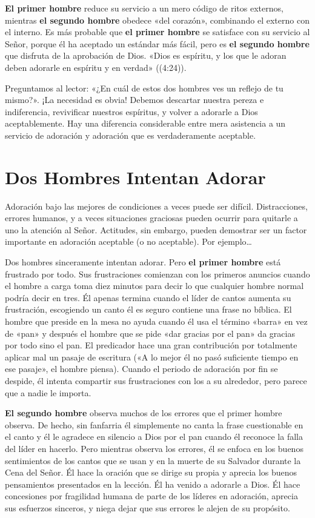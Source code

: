 \documentclass[12pt, twoside, openright]{book}
\begin{document}
\textbf{El primer hombre} reduce su servicio a un mero código de ritos externos, mientras \textbf{el segundo hombre} obedece «del corazón», combinando el externo con el interno. Es más probable que \textbf{el primer hombre} se satisface con su servicio al Señor, porque él ha aceptado un estándar más fácil, pero es \textbf{el segundo hombre} que disfruta de la aprobación de Dios. «Dios es espíritu, y los que le adoran deben adorarle en espíritu y en verdad» ((4:24)). 

Preguntamos al lector: «¿En cuál de estos dos hombres ves un reflejo de tu mismo?». ¡La necesidad es obvia! Debemos descartar nuestra pereza e indiferencia, revivificar nuestros espíritus, y volver a adorarle a Dios aceptablemente. Hay una diferencia considerable entre mera asistencia a un servicio de adoración y adoración que es verdaderamente aceptable. 

\section{Dos Hombres Intentan Adorar}
Adoración bajo las mejores de condiciones a veces puede ser difícil. Distracciones, errores humanos, y a veces situaciones graciosas pueden ocurrir para quitarle a uno la atención al Señor. Actitudes, sin embargo, pueden demostrar ser un factor importante en adoración aceptable (o no aceptable). Por ejemplo\ldots

Dos hombres sinceramente intentan adorar. Pero \textbf{el primer hombre} está frustrado por todo. Sus frustraciones comienzan con los primeros anuncios cuando el hombre a carga toma diez minutos para decir lo que cualquier hombre normal podría decir en tres. Él apenas termina cuando el líder de cantos aumenta su frustración, escogiendo un canto él es seguro contiene una frase no bíblica. El hombre que preside en la mesa no ayuda cuando él usa el término «barra» en vez de «pan» y después el hombre que se pide «dar gracias por el pan» da gracias por todo sino el pan. El predicador hace una gran contribución por totalmente aplicar mal un pasaje de escritura («A lo mejor él no pasó suficiente tiempo en ese pasaje», el hombre piensa). Cuando el periodo de adoración por fin se despide, él intenta compartir sus frustraciones con los a su alrededor, pero parece que a nadie le importa. 

\textbf{El segundo hombre} observa muchos de los errores que el primer hombre observa. De hecho, sin fanfarria él simplemente no canta la frase cuestionable en el canto y él le agradece en silencio a Dios por el pan cuando él reconoce la falla del líder en hacerlo. Pero mientras observa los errores, él se enfoca en los buenos sentimientos de los cantos que se usan y en la muerte de su Salvador durante la Cena del Señor. Él hace la oración que se dirige su propia y aprecia los buenos pensamientos presentados en la lección. Él ha venido a adorarle a Dios. Él hace concesiones por fragilidad humana de parte de los líderes en adoración, aprecia sus esfuerzos sinceros, y niega dejar que sus errores le alejen de su propósito.  
\end{document}
